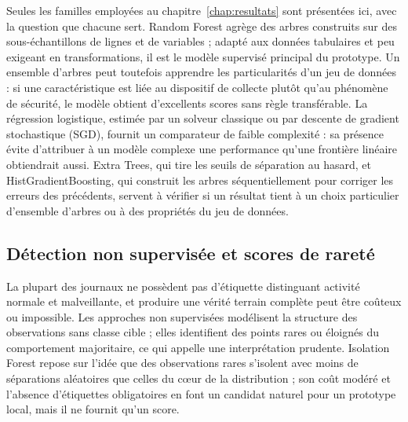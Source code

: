 Seules les familles employées au chapitre~\ref{chap:resultats} sont présentées ici, avec la question que chacune sert. Random Forest agrège des arbres construits sur des sous-échantillons de lignes et de variables \cite{breiman2001random} ; adapté aux données tabulaires et peu exigeant en transformations, il est le modèle supervisé principal du prototype. Un ensemble d'arbres peut toutefois apprendre les particularités d'un jeu de données : si une caractéristique est liée au dispositif de collecte plutôt qu'au phénomène de sécurité, le modèle obtient d'excellents scores sans règle transférable. La régression logistique, estimée par un solveur classique ou par descente de gradient stochastique (SGD), fournit un comparateur de faible complexité : sa présence évite d'attribuer à un modèle complexe une performance qu'une frontière linéaire obtiendrait aussi. Extra Trees, qui tire les seuils de séparation au hasard, et HistGradientBoosting, qui construit les arbres séquentiellement pour corriger les erreurs des précédents, servent à vérifier si un résultat tient à un choix particulier d'ensemble d'arbres ou à des propriétés du jeu de données.

\subsection{Détection non supervisée et scores de rareté}

La plupart des journaux ne possèdent pas d'étiquette distinguant activité normale et malveillante, et produire une vérité terrain complète peut être coûteux ou impossible. Les approches non supervisées modélisent la structure des observations sans classe cible ; elles identifient des points rares ou éloignés du comportement majoritaire, ce qui appelle une interprétation prudente. Isolation Forest repose sur l'idée que des observations rares s'isolent avec moins de séparations aléatoires que celles du cœur de la distribution \cite{liu2008isolation} ; son coût modéré et l'absence d'étiquettes obligatoires en font un candidat naturel pour un prototype local, mais il ne fournit qu'un score.

